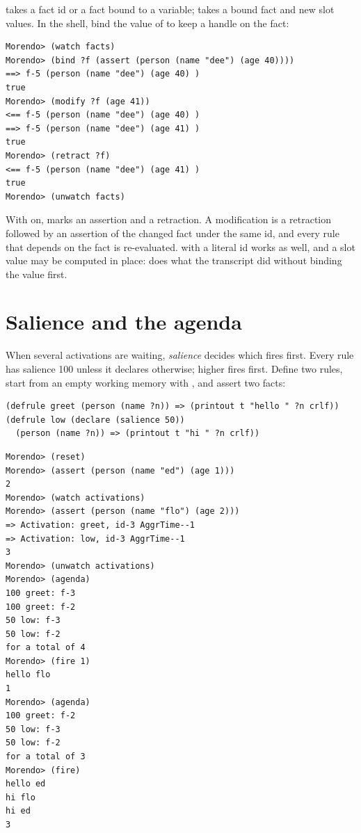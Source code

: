  takes a fact id or a fact bound to a variable; 
takes a bound fact and new slot values. In the shell, bind the value of
 to keep a handle on the fact:

\begin{lstlisting}[style=shell]
Morendo> (watch facts)
Morendo> (bind ?f (assert (person (name "dee") (age 40))))
==> f-5 (person (name "dee") (age 40) )
true
Morendo> (modify ?f (age 41))
<== f-5 (person (name "dee") (age 40) )
==> f-5 (person (name "dee") (age 41) )
true
Morendo> (retract ?f)
<== f-5 (person (name "dee") (age 41) )
true
Morendo> (unwatch facts)
\end{lstlisting}

With  on, \fn{==>} marks an assertion and \fn{<==} a
retraction. A modification is a retraction followed by an assertion of the
changed fact under the same id, and every rule that depends on the fact is
re-evaluated.  with a literal id works as well, and a
slot value may be computed in place: 
does what the transcript did without binding the value first.

\section{Salience and the agenda}
\label{sec:tutorial-salience}

When several activations are waiting, \emph{salience} decides which fires
first. Every rule has salience 100 unless it declares otherwise; higher
fires first. Define two rules, start from an empty working memory with
, and assert two facts:

\begin{lstlisting}
(defrule greet (person (name ?n)) => (printout t "hello " ?n crlf))
(defrule low (declare (salience 50))
  (person (name ?n)) => (printout t "hi " ?n crlf))
\end{lstlisting}

\begin{lstlisting}[style=shell]
Morendo> (reset)
Morendo> (assert (person (name "ed") (age 1)))
2
Morendo> (watch activations)
Morendo> (assert (person (name "flo") (age 2)))
=> Activation: greet, id-3 AggrTime--1
=> Activation: low, id-3 AggrTime--1
3
Morendo> (unwatch activations)
Morendo> (agenda)
100 greet: f-3
100 greet: f-2
50 low: f-3
50 low: f-2
for a total of 4
Morendo> (fire 1)
hello flo
1
Morendo> (agenda)
100 greet: f-2
50 low: f-3
50 low: f-2
for a total of 3
Morendo> (fire)
hello ed
hi flo
hi ed
3
\end{lstlisting}

